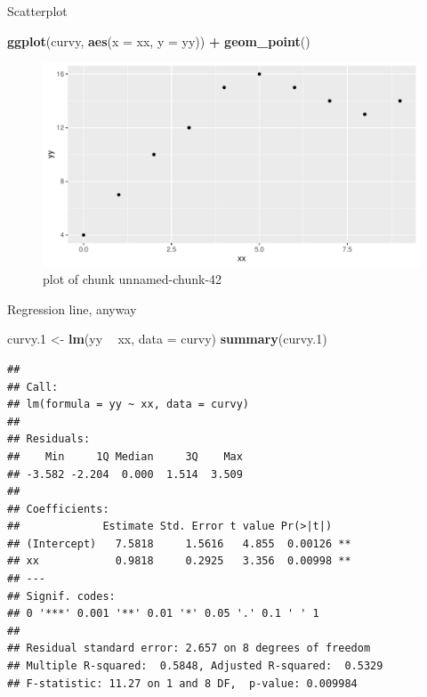 \documentclass[ignorenonframetext,]{beamer}
\newenvironment{Shaded}{\begin{snugshade}}{\end{snugshade}}
\newcommand{\DataTypeTok}[1]{\textcolor[rgb]{0.13,0.29,0.53}{#1}}
\newcommand{\FloatTok}[1]{\textcolor[rgb]{0.00,0.00,0.81}{#1}}
\newcommand{\KeywordTok}[1]{\textcolor[rgb]{0.13,0.29,0.53}{\textbf{#1}}}
\newcommand{\NormalTok}[1]{#1}
\newcommand{\OperatorTok}[1]{\textcolor[rgb]{0.81,0.36,0.00}{\textbf{#1}}}
\newcommand{\StringTok}[1]{\textcolor[rgb]{0.31,0.60,0.02}{#1}}
\begin{document}
\begin{frame}[fragile]{Scatterplot}
\protect\hypertarget{scatterplot}{}

\begin{Shaded}
\begin{Highlighting}[]
\KeywordTok{ggplot}\NormalTok{(curvy, }\KeywordTok{aes}\NormalTok{(}\DataTypeTok{x =}\NormalTok{ xx, }\DataTypeTok{y =}\NormalTok{ yy)) }\OperatorTok{+}\StringTok{ }\KeywordTok{geom_point}\NormalTok{()}
\end{Highlighting}
\end{Shaded}

\begin{figure}
\centering
\includegraphics{figure/unnamed-chunk-42-1.pdf}
\caption{plot of chunk unnamed-chunk-42}
\end{figure}

\end{frame}

\begin{frame}[fragile]{Regression line, anyway}
\protect\hypertarget{regression-line-anyway}{}

\scriptsize

\begin{Shaded}
\begin{Highlighting}[]
\NormalTok{curvy}\FloatTok{.1}\NormalTok{ <-}\StringTok{ }\KeywordTok{lm}\NormalTok{(yy }\OperatorTok{~}\StringTok{ }\NormalTok{xx, }\DataTypeTok{data =}\NormalTok{ curvy)}
\KeywordTok{summary}\NormalTok{(curvy}\FloatTok{.1}\NormalTok{)}
\end{Highlighting}
\end{Shaded}

\begin{verbatim}
## 
## Call:
## lm(formula = yy ~ xx, data = curvy)
## 
## Residuals:
##    Min     1Q Median     3Q    Max 
## -3.582 -2.204  0.000  1.514  3.509 
## 
## Coefficients:
##             Estimate Std. Error t value Pr(>|t|)   
## (Intercept)   7.5818     1.5616   4.855  0.00126 **
## xx            0.9818     0.2925   3.356  0.00998 **
## ---
## Signif. codes:  
## 0 '***' 0.001 '**' 0.01 '*' 0.05 '.' 0.1 ' ' 1
## 
## Residual standard error: 2.657 on 8 degrees of freedom
## Multiple R-squared:  0.5848, Adjusted R-squared:  0.5329 
## F-statistic: 11.27 on 1 and 8 DF,  p-value: 0.009984
\end{verbatim}

\normalsize

\end{frame}
\end{document}
